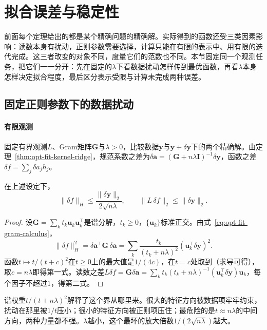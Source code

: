 \section{拟合误差与稳定性}
\label{sec:opt-fit-error}

前面每个定理给出的都是某个精确问题的精确解。实际得到的函数还受三类因素影响：读数本身有扰动，正则参数需要选择，计算只能在有限的表示中、用有限的迭代完成。这三者改变的对象不同，度量它们的范数也不同。本节固定同一个观测任务，把它们一一分开：先在固定的$\lambda$下看数据扰动怎样传到最优函数，再看$\lambda$本身怎样决定拟合程度，最后区分表示受限与计算未完成两种误差。

\subsection{固定正则参数下的数据扰动}
\label{sec:opt-fit-data-perturbation}

\paragraph{有限观测}
固定有界观测$L$、Gram矩阵$\bm G$与$\lambda>0$，比较数据$\bm y$与$\bm y+\delta\bm y$下的两个精确解。由定理~\ref{thm:opt-fit-kernel-ridge}，规范系数之差为$\delta\bm a=(\bm G+n\lambda\bm I)^{-1}\delta\bm y$，函数之差$\delta f=\sum_j\delta a_jh_j$。

\begin{theorem}[有限观测下的数据稳定性]
\label{thm:opt-fit-data-stability}
在上述设定下，
\[
  \|\delta f\|_H\le\frac{\|\delta\bm y\|_2}{2\sqrt{n\lambda}},\qquad
  \|L\,\delta f\|_2\le\|\delta\bm y\|_2 .
\]
\end{theorem}

\begin{proof}
设$\bm G=\sum_kt_k\bm u_k\bm u_k^\top$是谱分解，$t_k\ge0$，$\{\bm u_k\}$标准正交。由式~\eqref{eq:opt-fit-gram-calculus}，
\[
  \|\delta f\|_H^2=\delta\bm a^\top\bm G\,\delta\bm a=\sum_k\frac{t_k}{(t_k+n\lambda)^2}(\bm u_k^\top\delta\bm y)^2 .
\]
函数$t\mapsto t/(t+c)^2$在$t\ge0$上的最大值是$1/(4c)$，在$t=c$处取到（求导可得），取$c=n\lambda$即得第一式。读数之差$L\delta f=\bm G\delta\bm a=\sum_kt_k(t_k+n\lambda)^{-1}(\bm u_k^\top\delta\bm y)\bm u_k$，每个因子不超过$1$，得第二式。
\end{proof}

谱权重$t/(t+n\lambda)^2$解释了这个界从哪里来。很大的特征方向被数据项牢牢约束，扰动在那里被$1/t$压小；很小的特征方向被正则项压住；最危险的是$t\approx n\lambda$的中间方向，两种力量都不强。$\lambda$越小，这个最坏的放大倍数$1/(2\sqrt{n\lambda})$越大。

